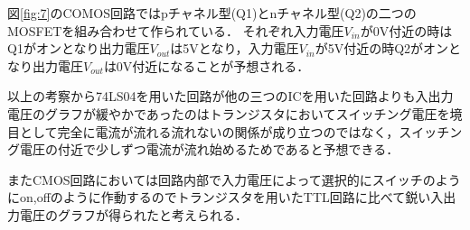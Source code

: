 \documentclass[11pt, a4paper,twocolumn]{jarticle}
\begin{document}
図\ref{fig:7}のCOMOS回路ではpチャネル型(Q1)とnチャネル型(Q2)の二つのMOSFETを組み合わせて作られている．
それぞれ入力電圧$V_{in}$が0V付近の時はQ1がオンとなり出力電圧$V_{out}$は5Vとなり，入力電圧$V_{in}$が5V付近の時Q2がオンとなり出力電圧$V_{out}$は0V付近になることが予想される．

以上の考察から74LS04を用いた回路が他の三つのICを用いた回路よりも入出力電圧のグラフが緩やかであったのはトランジスタにおいてスイッチング電圧を境目として完全に電流が流れる流れないの関係が成り立つのではなく，スイッチング電圧の付近で少しずつ電流が流れ始めるためであると予想できる．

またCMOS回路においては回路内部で入力電圧によって選択的にスイッチのようにon,offのように作動するのでトランジスタを用いたTTL回路に比べて鋭い入出力電圧のグラフが得られたと考えられる．






\newpage
\end{document}
